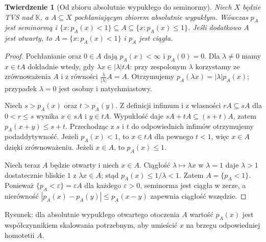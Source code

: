 \documentclass[11pt,a4paper]{article}
\numberwithin{equation}{section}
\theoremstyle{plain}
\newtheorem{twierdzenie}{Twierdzenie}[section]
\theoremstyle{definition}
\theoremstyle{remark}
\newcommand{\K}{\mathbb K}
\begin{document}
\begin{twierdzenie}[Od zbioru absolutnie wypukłego do seminormy]
\label{thm:minkowski}
Niech $X$ będzie TVS nad $\K$, a $A\subseteq X$
pochłaniającym zbiorem absolutnie wypukłym.
Wówczas $p_A$ jest seminormą i
$\{x:p_A(x)<1\}\subseteq A\subseteq\{x:p_A(x)\le1\}$.
Jeśli dodatkowo $A$ jest \emph{otwarty}, to
$A=\{x:p_A(x)<1\}$ i $p_A$ jest ciągła.
\end{twierdzenie}
\begin{proof}
Pochłanianie oraz $0\in A$ dają $p_A(x)<\infty$ i
$p_A(0)=0$. Dla $\lambda\ne0$ mamy
$x\in tA$ dokładnie wtedy, gdy $\lambda x\in|\lambda|tA$:
przy zespolonym $\lambda$ korzystamy ze zrównoważenia
$A$ i z równości $\frac{\lambda}{|\lambda|}A=A$.
Otrzymujemy $p_A(\lambda x)=|\lambda|p_A(x)$;
przypadek $\lambda=0$ jest osobny i natychmiastowy.

Niech $s>p_A(x)$ oraz $t>p_A(y)$. Z definicji infimum
i z własności $rA\subseteq sA$ dla $0<r\le s$
wynika $x\in sA$ i $y\in tA$. Wypukłość daje
$sA+tA\subseteq(s+t)A$, zatem
$p_A(x+y)\le s+t$. Przechodząc z $s$ i $t$ do
odpowiednich infimów otrzymujemy podaddytywność.
Jeżeli $p_A(x)<1$, to $x\in tA$ dla pewnego $t<1$,
więc $x\in A$ dzięki zrównoważeniu.
Jeżeli $x\in A$, to $p_A(x)\le1$.

Niech teraz $A$ będzie otwarty i niech $x\in A$.
Ciągłość $\lambda\mapsto\lambda x$ w $\lambda=1$
daje $\lambda>1$ dostatecznie bliskie $1$ z
$\lambda x\in A$; stąd $p_A(x)\le1/\lambda<1$.
Zatem $A=\{p_A<1\}$.
Ponieważ $\{p_A<\varepsilon\}=\varepsilon A$
dla każdego $\varepsilon>0$, seminorma jest ciągła
w zerze, a nierówność
$|p_A(x)-p_A(y)|\le p_A(x-y)$ zapewnia ciągłość wszędzie.
\end{proof}

\begin{center}

\small Rysunek: dla absolutnie wypukłego otwartego otoczenia $A$
wartość $p_A(x)$ jest współczynnikiem skalowania potrzebnym,
aby umieścić $x$ na brzegu odpowiedniej homotetii $A$.
\end{center}
\end{document}
